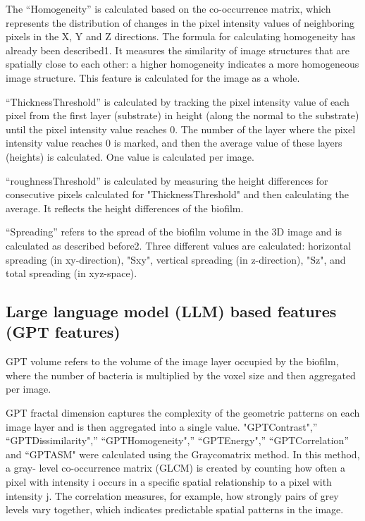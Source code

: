 \documentclass{ol-softwaremanual}
\begin{document}
The “Homogeneity” is calculated based on the co-occurrence matrix, which represents the distribution of changes in the pixel intensity values of neighboring pixels in the X, Y and Z directions. The formula for calculating homogeneity has already been described1. It measures the similarity of image structures that are spatially close to each other: a higher homogeneity indicates a more homogeneous image structure. This feature is calculated for the image as a whole. 

“ThicknessThreshold” is calculated by tracking the pixel intensity value of each pixel from the first layer (substrate) in height (along the normal to the substrate) until the pixel intensity value reaches 0. The number of the layer where the pixel intensity value reaches 0 is marked, and then the average value of these layers (heights) is calculated. One value is calculated per image.

“roughnessThreshold” is calculated by measuring the height differences for consecutive pixels calculated for "ThicknessThreshold" and then calculating the average. It reflects the height differences of the biofilm.

“Spreading” refers to the spread of the biofilm volume in the 3D image and is calculated as described before2. Three different values are calculated: horizontal spreading (in xy-direction), "Sxy", vertical spreading (in z-direction), "Sz", and total spreading (in xyz-space).

\subsection{Large language model (LLM) based features (GPT features)}

GPT volume refers to the volume of the image layer occupied by the biofilm, where the number of bacteria is multiplied by the voxel size and then aggregated per image.

GPT fractal dimension captures the complexity of the geometric patterns on each image layer and is then aggregated into a single value.
"GPTContrast",” “GPTDissimilarity",” “GPTHomogeneity",” “GPTEnergy",” “GPTCorrelation” and “GPTASM" were calculated using the Graycomatrix method. In this method, a gray- level co-occurrence matrix (GLCM) is created by counting how often a pixel with intensity i occurs in a specific spatial relationship to a pixel with intensity j. The correlation measures, for example, how strongly pairs of grey levels vary together, which indicates predictable spatial patterns in the image.
\end{document}
